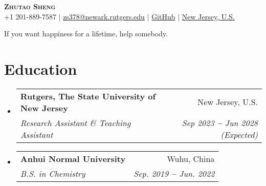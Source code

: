 \documentclass[letterpaper,11pt]{article}
\makeatletter
\newcommand{\resumeSubheading}[4]{
	\vspace{-2pt}\item
	\begin{tabular*}{0.97\textwidth}[t]{l@{\extracolsep{\fill}}r}
		\textbf{#1} & #2 \\
		\textit{\small#3} & \textit{\small #4} \\
	\end{tabular*}\vspace{-7pt}
}
\newcommand{\resumeSubHeadingListStart}{\begin{itemize}[leftmargin=0.15in, label={}]}
\newcommand{\resumeSubHeadingListEnd}{\end{itemize}}
\makeatother
\begin{document}
	
	
	\begin{center}
		\textbf{\Huge \scshape \textbf{\color{red}Zhutao Sheng}} \\ \vspace{3pt}
		\small
		\faMobile \hspace{.5pt} {+1 201-889-7587}
		$|$
		\faAt \hspace{.5pt} \href{mailto:arasgungore09@gmail.com}{zs378@newark.rutgers.edu}
		$|$
		\faGithub \hspace{.5pt} \href{https://github.com/zhutaosheng}{GitHub}
		$|$
		\faMapMarker \hspace{.5pt} \href{https://www.google.com/maps/place/Olson+Hall+-+Chemistry/@40.7409235,-74.1751715,17.38z/data=!4m6!3m5!1s0x89c2537e60739387:0xcc3cf6ac4fa15af4!8m2!3d40.7401976!4d-74.1753061!16s%2Fg%2F11fy965_6r}{New Jersey, U.S.}
	\end{center}
	
	\begin{center}
		\color{red}If you want happiness for a lifetime, help somebody.
	\end{center}
	
	
	\section{\textbf{\color{red}Education}}
	\vspace{3pt}
	\resumeSubHeadingListStart
	
	\resumeSubheading
	{Rutgers, The State University of New Jersey}{New Jersey, U.S.}
	{Research Assistant \& Teaching Assistant}{Sep 2023 \textbf{--} Jun 2028 (Expected)}
	
	
	\resumeSubheading
	{Anhui Normal University }{Wuhu, China}
	{B.S. in Chemistry}{Sep. 2019 \textbf{--} Jun. 2022}
	
	\resumeSubHeadingListEnd
	
	
	
	
	
\end{document}
